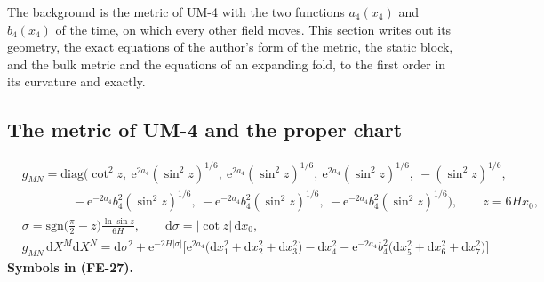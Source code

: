 \documentclass[
  10pt,
]{article}
\begin{document}
The background is the metric of UM-4 with the two functions \(a_4(x_4)\)
and \(b_4(x_4)\) of the time, on which every other field moves. This
section writes out its geometry, the exact equations of the author's
form of the metric, the static block, and the bulk metric and the
equations of an expanding fold, to the first order in its curvature and
exactly.

\hypertarget{the-metric-of-um-4-and-the-proper-chart}{%
\subsection{The metric of UM-4 and the proper
chart}\label{the-metric-of-um-4-and-the-proper-chart}}

\[
\begin{aligned}
&g_{MN} = \mathrm{diag}\Big(\cot^2z,\ \mathrm{e}^{2a_4}(\sin^2z)^{1/6},\ \mathrm{e}^{2a_4}(\sin^2z)^{1/6},
 \ \mathrm{e}^{2a_4}(\sin^2z)^{1/6},\ -(\sin^2z)^{1/6},\\
&\qquad\qquad -\mathrm{e}^{-2a_4}b_4^2(\sin^2z)^{1/6},\ -\mathrm{e}^{-2a_4}b_4^2(\sin^2z)^{1/6},
 \ -\mathrm{e}^{-2a_4}b_4^2(\sin^2z)^{1/6}\Big),\qquad z = 6Hx_0,\\
&\sigma = \mathrm{sgn}\Big(\frac{\pi}{2} - z\Big)\frac{\ln\sin z}{6H},\qquad \mathrm{d}\sigma = \lvert\cot z\rvert\,\mathrm{d}x_0,\\
&g_{MN}\,\mathrm{d}X^M\mathrm{d}X^N = \mathrm{d}\sigma^2 + \mathrm{e}^{-2H\lvert\sigma\rvert}\Big[\mathrm{e}^{2a_4}\big(\mathrm{d}x_1^2
 + \mathrm{d}x_2^2 + \mathrm{d}x_3^2\big) - \mathrm{d}x_4^2 - \mathrm{e}^{-2a_4}b_4^2\big(\mathrm{d}x_5^2 + \mathrm{d}x_6^2 + \mathrm{d}x_7^2\big)\Big]
\end{aligned} \tag{FE-27}
\] \textbf{Symbols in (FE-27).}
\end{document}
